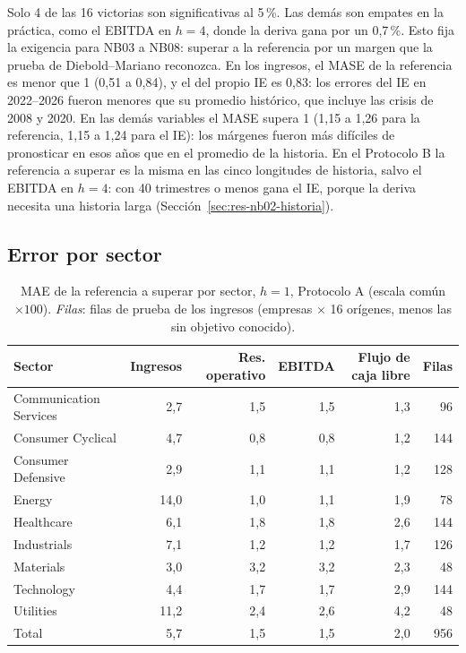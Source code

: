 \documentclass[12pt,letterpaper,oneside]{report}
\renewcommand{\_}{\UnderscoreOriginal\allowbreak}
\begin{document}
Solo 4 de las 16 victorias son significativas al 5\,\%. Las demás son empates en la práctica, como el EBITDA en $h = 4$, donde la deriva gana por un 0,7\,\%. Esto fija la exigencia para NB03 a NB08: superar a la referencia por un margen que la prueba de Diebold--Mariano reconozca. En los ingresos, el MASE de la referencia es menor que 1 (0,51 a 0,84), y el del propio IE es 0,83: los errores del IE en 2022--2026 fueron menores que su promedio histórico, que incluye las crisis de 2008 y 2020. En las demás variables el MASE supera 1 (1,15 a 1,26 para la referencia, 1,15 a 1,24 para el IE): los márgenes fueron más difíciles de pronosticar en esos años que en el promedio de la historia. En el Protocolo B la referencia a superar es la misma en las cinco longitudes de historia, salvo el EBITDA en $h = 4$: con 40 trimestres o menos gana el IE, porque la deriva necesita una historia larga (Sección~\ref{sec:res-nb02-historia}).

\subsection{Error por sector}

\begin{table}[H]
\centering
\caption{MAE de la referencia a superar por sector, $h = 1$, Protocolo A (escala común $\times 100$). \emph{Filas}: filas de prueba de los ingresos (empresas $\times$ 16 orígenes, menos las sin objetivo conocido).}
\label{tab:referencia-sector}
\small
\begin{tabular}{@{}lrrrrr@{}}
\toprule
Sector & Ingresos & Res. operativo & EBITDA & Flujo de caja libre & Filas \\
\midrule
Communication Services & 2,7 & 1,5 & 1,5 & 1,3 & 96 \\
Consumer Cyclical & 4,7 & 0,8 & 0,8 & 1,2 & 144 \\
Consumer Defensive & 2,9 & 1,1 & 1,1 & 1,2 & 128 \\
Energy & 14,0 & 1,0 & 1,1 & 1,9 & 78 \\
Healthcare & 6,1 & 1,8 & 1,8 & 2,6 & 144 \\
Industrials & 7,1 & 1,2 & 1,2 & 1,7 & 126 \\
Materials & 3,0 & 3,2 & 3,2 & 2,3 & 48 \\
Technology & 4,4 & 1,7 & 1,7 & 2,9 & 144 \\
Utilities & 11,2 & 2,4 & 2,6 & 4,2 & 48 \\
\midrule
Total & 5,7 & 1,5 & 1,5 & 2,0 & 956 \\
\bottomrule
\end{tabular}
\end{table}
\end{document}
